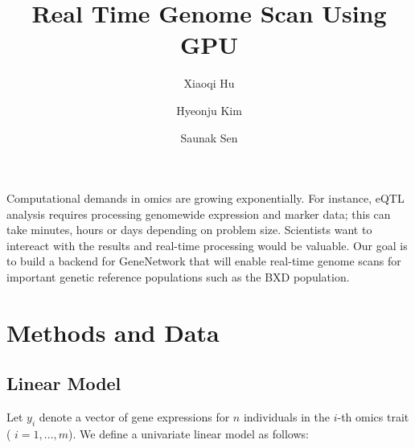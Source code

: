 \documentclass[9pt,twocolumn,twoside,lineno]{gsag3jnl}
\title{Real Time Genome Scan Using GPU}
\author[$\ast$]{Xiaoqi Hu}
\author[$\ast$]{Hyeonju Kim}
\author[$\ast$]{Saunak Sen}
\affil[$\ast$]{University of Tennessee Health Science Center}
\begin{document}
\maketitle
\thispagestyle{firststyle}
\logomark
\articletypemark
\marginmark
\firstpagefootnote


\vspace{-34pt}%

\noindent        Computational demands in omics are growing exponentially. For
instance, eQTL analysis requires processing genomewide
expression and marker data; this can take minutes, hours or
days depending on problem size.  Scientists want to intereact
with the results and real-time processing would be valuable.
Our goal is to build a backend for GeneNetwork that will enable
real-time genome scans for important genetic reference
populations such as the BXD population.


\section{Methods and Data}
\label{sec:methods:Data}


\subsection{Linear Model} 
 Let $y_i$ denote a vector of gene expressions for $n$
individuals in the $i$-th omics trait ( $i=1,\ldots,m$).  We
define a univariate linear model as follows:
\end{document}
